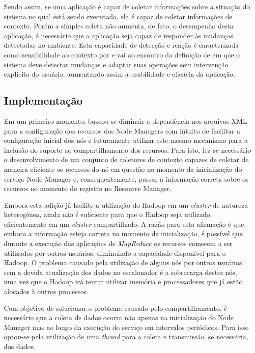 Sendo assim, se uma aplicação é capaz de coletar informações sobre a situação do sistema no qual está sendo executada, ela é capaz de coletar informações de contexto. Porém a simples coleta não aumenta, de fato, o desempenho desta aplicação, é necessário que a aplicação seja capaz de responder às mudanças detectadas no ambiente. Esta capacidade de detecção e reação é caracterizada como sensibilidade ao contexto por \cite{Maamar} e vai ao encontro da definição de \cite{Baldauf} em que o sistema deve detectar mudanças e adaptar suas operações sem intervenção explícita do usuário, aumentando assim a usabilidade e eficácia da aplicação.

\subsection{Implementação}
Em um primeiro momento, buscou-se diminuir a dependência nos arquivos XML para a configuração dos recursos dos Node Managers com intuito de facilitar a configuração inicial dos nós e futuramente utilizar este mesmo mecanismo para a inclusão do suporte ao compartilhamento dos recursos. Para isto, fez-se necessário o desenvolvimento de um conjunto de coletores de contexto capazes de coletar de maneira eficiente os recursos do nó em questão no momento da inicialização do serviço Node Manager e, consequentemente, passar a informação correta sobre os recursos no momento do registro no Resource Manager.

Embora esta adição já facilite a utilização do Hadoop em um \textit{cluster} de natureza heterogênea, ainda não é suficiente para que o Hadoop seja utilizado eficientemente em um \textit{cluster} compartilhado. A razão para esta afirmação é que, embora a informação esteja correta no momento de inicialização, é possível que durante a execução das aplicações de \textit{MapReduce} os recursos comecem a ser utilizados por outros usuários, diminuindo a capacidade disponível para o Hadoop. O problema causado pela utilização de alguns nós por outros usuários sem a devida atualização dos dados no escalonador é a sobrecarga destes nós, uma vez que o Hadoop irá tentar utilizar memória e processadores que já estão alocados à outros processos.

Com objetivo de solucionar o problema causado pelo compartilhamento, é necessário que a coleta de dados ocorra não apenas na inicialização do Node Manager mas ao longo da execução do serviço em intervalos periódicos. Para isso optou-se pela utilização de uma \textit{thread} para a coleta e transmissão, se necessária, dos dados.

